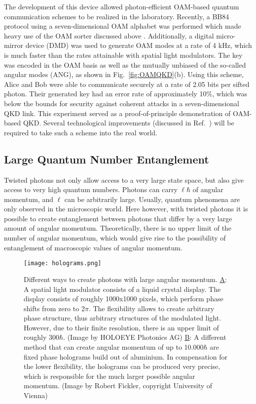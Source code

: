 \documentclass{article}
\begin{document}
The development of this device allowed photon-efficient OAM-based quantum communication schemes to be realized in the laboratory. Recently, a BB84 protocol using a seven-dimensional OAM alphabet was performed which made heavy use of the OAM sorter discussed above \cite{Mirhosseini:2015fy}. Additionally, a digital micro-mirror device (DMD) was used to generate OAM modes at a rate of 4 kHz, which is much faster than the rates attainable with spatial light modulators. The key was encoded in the OAM basis as well as the mutually unbiased of the so-called angular modes (ANG), as shown in Fig.~\ref{fig:OAMQKD}(b). Using this scheme, Alice and Bob were able to communicate securely at a rate of 2.05 bits per sifted photon. Their generated key had an error rate of approximately 10\%, which was below the bounds for security against coherent attacks in a seven-dimensional QKD link. This experiment served as a proof-of-principle demonstration of OAM-based QKD. Several technological improvements (discussed in Ref.~\cite{Mirhosseini:2015fy}) will be required to take such a scheme into the real world.

\subsection{Large Quantum Number Entanglement}
Twisted photons not only allow access to a very large state space, but also give access to very high quantum numbers. Photons can carry $\ell\hbar$ of angular momentum, and $\ell$ can be arbitrarily large. Usually, quantum phenomena are only observed in the microscopic world. Here however, with twisted photons it is possible to create entanglement between photons that differ by a very large amount of angular momentum. Theoretically, there is no upper limit of the number of angular momentum, which would give rise to the possibility of entanglement of macroscopic values of angular momentum.

\begin{figure}[h!]
\centering
\texttt{[image: holograms.png]}
\caption{Different ways to create photons with large angular momentum. \underline{A}: A spatial light modulator consists of a liquid crystal display. The display consists of roughly 1000x1000 pixels, which perform phase shifts from zero to 2$\pi$. The flexibility allows to create arbitrary phase structure, thus arbitrary structures of the modulated light. However, due to their finite resolution, there is an upper limit of roughly 300$\hbar$. (Image by HOLOEYE Photonics AG) \underline{B}: A different method that can create angular momentum of up to 10.000$\hbar$ are fixed phase holograms build out of aluminium. In compensation for the lower flexibility, the holograms can be produced very precise, which is responsible for the much larger possible angular momentum. (Image by Robert Fickler, copyright University of Vienna)}
\label{fig:OAMholo}
\end{figure}
\end{document}
